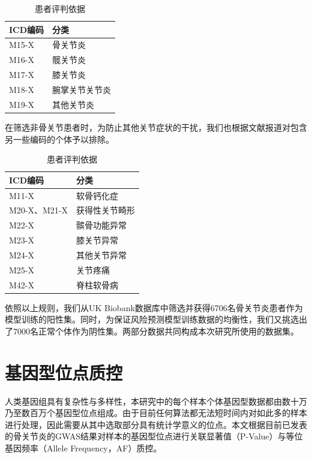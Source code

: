 \begin{table}[!h]
	\renewcommand{\arraystretch}{1.2}
	\centering\wuhao
	\caption{患者评判依据} \label{ICD_include} \vspace{2mm}
	\begin{tabularx}{\textwidth} { 
   >{\centering\arraybackslash}X 
   >{\centering\arraybackslash}X  }
	\toprule[1.5pt]
		ICD编码 & 分类 \\
	\midrule[1pt]
		M15-X & 骨关节炎 \\
        M16-X & 髋关节炎 \\
        M17-X & 膝关节炎 \\
        M18-X & 腕掌关节关节炎 \\
        M19-X & 其他关节炎 \\
	\bottomrule[1.5pt]
	\end{tabularx}
\end{table}
在筛选非骨关节患者时，为防止其他关节症状的干扰，我们也根据文献报道对包含另一些编码的个体予以排除。
\begin{table}[!h]
	\renewcommand{\arraystretch}{1.2}
	\centering\wuhao
	\caption{患者评判依据} \label{ICD_exclude} \vspace{2mm}
	\begin{tabularx}{\textwidth} { 
   >{\centering\arraybackslash}X 
   >{\centering\arraybackslash}X }
	\toprule[1.5pt]
		ICD编码 & 分类 \\
	\midrule[1pt]
		M11-X & 软骨钙化症 \\
        M20-X、M21-X & 获得性关节畸形 \\
        M22-X & 髌骨功能异常 \\
        M23-X & 膝关节异常 \\
        M24-X & 其他关节异常 \\
        M25-X & 关节疼痛 \\
        M42-X & 脊柱软骨病 \\
	\bottomrule[1.5pt]
	\end{tabularx}
\end{table}
依照以上规则，我们从UK Biobank数据库中筛选并获得6706名骨关节炎患者作为模型训练的阳性集。同时，为保证风险预测模型训练数据的均衡性，我们又挑选出了7000名正常个体作为阴性集。两部分数据共同构成本次研究所使用的数据集。

\section{基因型位点质控}

人类基因组具有复杂性与多样性，本研究中的每个样本个体基因型数据都由数十万乃至数百万个基因型位点组成。由于目前任何算法都无法短时间内对如此多的样本进行处理，因此需要从其中选取部分具有统计学意义的位点。本文根据目前已发表的骨关节炎的GWAS结果\cite{zengini_genome-wide_2018,arcogen_consortium_identification_2019}对样本的基因型位点进行关联显著值（P-Value）与等位基因频率（Allele Frequency，AF）质控。

